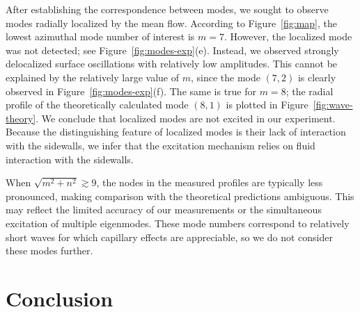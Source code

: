 \documentclass[aps,twocolumn]{revtex4-2}
\begin{document}
After establishing the correspondence between modes, we sought to observe modes radially localized by the mean flow. According to Figure~\ref{fig:map}, the lowest azimuthal mode number of interest is $m=7$. However, the localized mode was not detected; see Figure~\ref{fig:modes-exp}(e). Instead, we observed strongly delocalized surface oscillations with relatively low amplitudes. This cannot be explained by the relatively large value of $m$, since the mode $(7,2)$ is clearly observed in Figure~\ref{fig:modes-exp}(f). The same is true for $m=8$; the radial profile of the theoretically calculated mode $(8,1)$ is plotted in Figure~\ref{fig:wave-theory}. We conclude that localized modes are not excited in our experiment. Because the distinguishing feature of localized modes is their lack of interaction with the sidewalls, we infer that the excitation mechanism relies on fluid interaction with the sidewalls.

When $\sqrt{m^2+n^2}\gtrsim 9$, the nodes in the measured profiles are typically less pronounced, making comparison with the theoretical predictions ambiguous. This may reflect the limited accuracy of our measurements or the simultaneous excitation of multiple eigenmodes. These mode numbers correspond to relatively short waves for which capillary effects are appreciable, so we do not consider these modes further.


\section{Conclusion}
\label{sec:conclusion}
\end{document}
